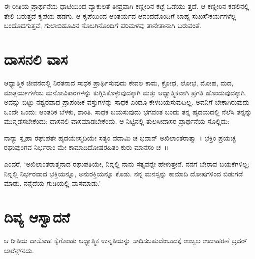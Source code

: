 ಈ ರೀತಿಯ ಪ್ರಾರ್ಥನೆಯ ಧಾಟಿಯಿಂದ ವ್ಯಾಕುಲತೆ ತೀವ್ರವಾಗಿ ಕಣ್ಣೀರಿನ ಕಟ್ಟೆ ಒಡೆಯು ತ್ತದೆ. ಆ ಕಣ್ಣೀರಿನ ಕಡಲಿನಲ್ಲಿ ತೇಲಿ ಬರುತ್ತದೆ ಕೃಪೆಯ ಹಡಗು. ಆ ಕೃಪೆಯಿಂದ ಆಂತರ್ಯದ ಆನಂದದೊಂದಿಗೆ ಬಾಹ್ಯ ಸುಖಸೌಕರ್ಯಗಳೆಲ್ಲ ಬಂದೊದಗುತ್ತವೆ, ಗುಲಾಬಿಹೂವಿನ ಸೊಬಗಿನೊಂದಿಗೆ ಪರಿಮಳವು ತಾನೇತಾನಾಗಿ ಬರುವಂತೆ.


\section{ದಾಸನಲಿ ವಾಸ}

ಆಧ್ಯಾತ್ಮಿಕ ಜೀವನದಲ್ಲಿ ನಿರತನಾದ ಸಾಧಕ ಪ್ರಾರ್ಥಿಸುವುದು ಕೇವಲ ಕಾಮ, ಕ್ರೋಧ, ಲೋಭ, ಮೋಹ, ಮದ, ಮಾತ್ಸರ್ಯಗಳೆಂಬ ಮನೋವಿಕಾರಗಳನ್ನು ಕುಗ್ಗಿಸಿಕೊಳ್ಳುವುದಕ್ಕಾಗಿ ಮತ್ತು ಆಧ್ಯಾತ್ಮಿಕವಾಗಿ ಪ್ರಗತಿ ಹೊಂದುವುದಕ್ಕಾಗಿ. ಅವನ್ನು ಬಿಟ್ಟು ನಶ್ವರವಾದ ಪ್ರಾಪಂಚಿಕ ವಸ್ತುಗಳನ್ನು ಸಾಧಕ ಎಂದೂ ಕೇಳಬಯಸುವುದಿಲ್ಲ. ಅವನಿಗೆ ಬೇಕಾಗಿರುವುದು ಒಂದೇ ಒಂದು: ಆಂತರಿಕ ಬೆಳಕು, ಶಾಂತಿ. ಸಾಧಕ ಬಯಸುವುದು ಭಗವಂತ ಬಂದು ತನ್ನ ಹೃದಯದಲ್ಲಿ ನೆಲೆಸಿ ತನ್ನನ್ನು ಮುನ್ನಡೆಸಬೇಕೆಂದು; ದಾಸನಲಿ ವಾಸಮಾಡಬೇಕೆಂದು. ಆ ನಿಟ್ಟಿನಲ್ಲಿ ತುಲಸೀದಾಸರ ಪ್ರಾರ್ಥನೆಯ ಸೊಲ್ಲಿದು:

ನಾನ್ಯಾ ಸ್ಪೃಹಾ ರಘುಪತೇ ಹೃದಯೇಸ್ಮದಿಯೇ ಸತ್ಯಂ ವದಾಮಿ ಚ ಭವಾನ್ ಅಖಿಲಾಂತರಾತ್ಮಾ~। ಭಕ್ತಿಂ ಪ್ರಯಚ್ಛ ರಘುಪುಂಗವ ನಿರ್ಭರಾಂ ಮೇ ಕಾಮಾದಿದೋಷರಹಿತಂ ಕುರು ಮಾನಸಂ ಚ~॥

ಎಂದರೆ, ‘ಅಖಿಲಾಂತರಾತ್ಮನಾದ ರಘುಪತಿಯೇ, ನಿನ್ನಲ್ಲಿ ನಾನು ಸತ್ಯವನ್ನೇ ಹೇಳುತ್ತೇನೆ. ನನಗೆ ಬೇರಾವ ಬಯಕೆಗಳಿಲ್ಲ; ನಿನ್ನಲ್ಲಿ ನಿರ್ಭರವಾದ ಭಕ್ತಿಯನ್ನೂ, ಅನುರಕ್ತಿಯನ್ನೂ ಕೊಡು. ನನ್ನ ಮನಸ್ಸನ್ನು ಕಾಮಾದಿ ದೋಷಗಳಿಂದ ಬಿಡುಗಡೆ ಮಾಡು. ನನ್ನೆದೆಯ ಗುಡಿಯಲ್ಲಿ ವಾಸಮಾಡು.’


\section{ದಿವ್ಯ ಆಸ್ವಾದನೆ}

ಆ ರೀತಿಯ ದಾಸೋಹ ಕೈಗೊಂಡು ಆಧ್ಯಾತ್ಮಿಕ ಉನ್ನತಿಯನ್ನು ಸಾಧಿಸಬಹುದೆಂಬುದಕ್ಕೆ ಉಜ್ವಲ ಉದಾಹರಣೆ ಬ್ರದರ್ ಲಾರೆನ್ಸ್​ನದು.

